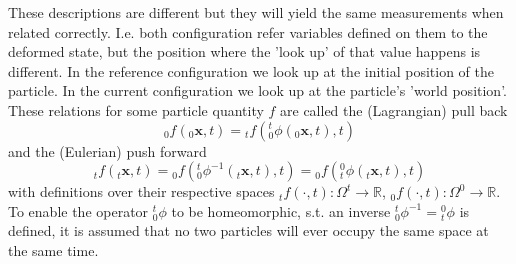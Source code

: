 \documentclass[m,times]{cgMA}
\begin{document}
These descriptions are different but they will yield the same measurements when related correctly. I.e. both configuration refer variables defined on them to the deformed state, but the position where the 'look up' of that value happens is different. In the reference configuration we look up at the initial position of the particle. In the current configuration we look up at the particle's 'world position'. These relations for some particle quantity $f$ are called the (Lagrangian) pull back
\begin{equation}
  _0f(_0\boldsymbol{x},t)= {_tf}({^t_0}\phi(_0\boldsymbol{x},t),t)
\end{equation}
and the (Eulerian) push forward
\begin{equation}\label{eq:push_forward}
  _tf(_t\boldsymbol{x},t) =  {_0f}({^t_0}\phi^{-1}(_t\boldsymbol{x},t),t) = {_0f}({_t^0}\phi(_t\boldsymbol{x},t),t)
\end{equation}
with definitions over their respective spaces $_tf ( \cdot , t ) : \Omega ^ {  { t } } \rightarrow \mathbb { R }$, $_0f ( \cdot , t ) : \Omega ^ {   { 0 } } \rightarrow \mathbb { R }$.  To enable the operator ${^t_0}\phi$ to be homeomorphic, s.t. an inverse ${^t_0}\phi^{-1} = {_t^0}\phi$ is defined, it is assumed that no two particles will ever occupy the same space at the same time.
\end{document}
